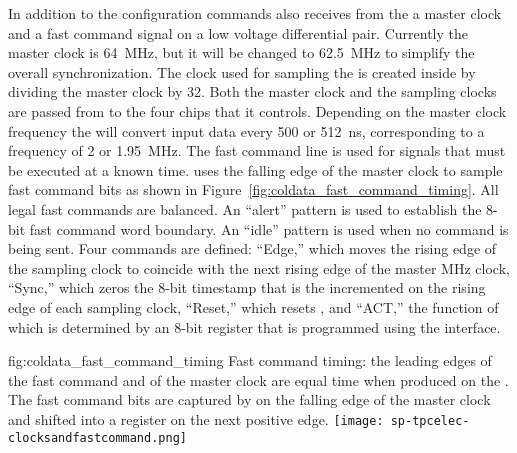 In addition to the configuration commands  also receives from
the  a master clock and a fast command signal on a low voltage 
differential pair. Currently the master clock is \SI{64}{MHz}, but it will be
changed to \SI{62.5}{MHz} to simplify the overall   
synchronization. The clock used for sampling the  is created inside
 by dividing the master clock by \num{32}. Both the master clock and
the  sampling clocks are passed from  to the four
 chips that it controls. Depending on the master clock frequency
the  will convert input data every \num{500} or \SI{512}{ns}, 
corresponding to a frequency of \num{2} or \SI{1.95}{MHz}. The fast command 
line is used for signals that must be executed at a known time.  
uses the falling edge of the master clock to sample fast command bits as shown 
in Figure~\ref{fig:coldata_fast_command_timing}. All legal fast commands 
are  balanced. An ``alert'' pattern is used to establish the 8-bit 
fast command word boundary. An ``idle'' pattern is used when no command is being 
sent. Four commands are defined: ``Edge,'' which moves the rising edge of the 
 sampling clock to coincide with the next rising edge of the 
master MHz clock, ``Sync,'' which zeros the 8-bit timestamp that is the incremented 
on the rising edge of each  sampling clock, ``Reset,'' which resets 
, and ``ACT,'' the function of which is determined by an 8-bit 
register that is programmed using the  interface.  

\begin{dunefigure}
{fig:coldata_fast_command_timing}
{Fast command timing: the leading edges of the fast command and of the master 
clock are equal time when produced on the . The fast command bits 
are captured by  on the falling edge of the master clock and 
shifted into a register on the next positive edge.}
\texttt{[image: sp-tpcelec-clocksandfastcommand.png]}
\end{dunefigure}

